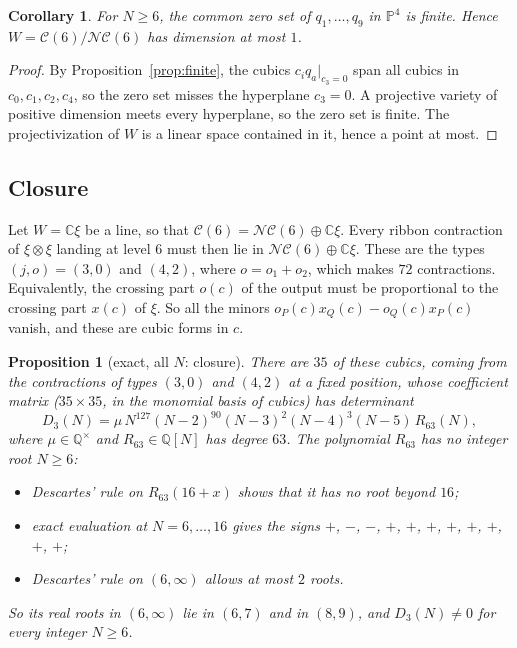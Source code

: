 \documentclass[11pt]{amsart}
\newtheorem{proposition}[theorem]{Proposition}
\newtheorem{corollary}[theorem]{Corollary}
\theoremstyle{definition}
\theoremstyle{remark}
\theoremstyle{plain}
\numberwithin{equation}{section}
\numberwithin{table}{section}
\newcommand{\C}{\mathbb C}
\newcommand{\Q}{\mathbb Q}
\newcommand{\NC}{\mathcal{NC}}
\begin{document}
\begin{corollary}\label{cor:line}
For $N\ge6$, the common zero set of $q_1,\dots,q_9$ in $\mathbb P^4$ is finite. Hence $W=\mathcal C(6)/\NC(6)$ has dimension at most $1$.
\end{corollary}

\begin{proof}
By Proposition~\ref{prop:finite}, the cubics $c_iq_a|_{c_3=0}$ span all cubics in $c_0,c_1,c_2,c_4$, so the zero set misses the hyperplane $c_3=0$. A projective variety of positive dimension meets every hyperplane, so the zero set is finite. The projectivization of $W$ is a linear space contained in it, hence a point at most.
\end{proof}

\subsection{Closure}

Let $W=\C\xi$ be a line, so that $\mathcal C(6)=\NC(6)\oplus\C\xi$. Every ribbon contraction of $\xi\otimes\xi$ landing at level $6$ must then lie in $\NC(6)\oplus\C\xi$. These are the types $(j,o)=(3,0)$ and $(4,2)$, where $o=o_1+o_2$, which makes $72$ contractions. Equivalently, the crossing part $o(c)$ of the output must be proportional to the crossing part $x(c)$ of $\xi$. So all the minors $o_P(c)x_Q(c)-o_Q(c)x_P(c)$ vanish, and these are cubic forms in $c$.

\begin{proposition}[exact, all $N$: closure]\label{prop:closure}
There are $35$ of these cubics, coming from the contractions of types $(3,0)$ and $(4,2)$ at a fixed position, whose coefficient matrix ($35\times35$, in the monomial basis of cubics) has determinant
\[
D_3(N)=\mu\,N^{127}(N-2)^{90}(N-3)^{2}(N-4)^{3}(N-5)\,R_{63}(N),
\]
where $\mu\in\Q^\times$ and $R_{63}\in\Q[N]$ has degree $63$. The polynomial $R_{63}$ has no integer root $N\ge6$:
\begin{itemize}
\item Descartes' rule on $R_{63}(16+x)$ shows that it has no root beyond $16$;
\item exact evaluation at $N=6,\dots,16$ gives the signs $+$, $-$, $-$, $+$, $+$, $+$, $+$, $+$, $+$, $+$, $+$;
\item Descartes' rule on $(6,\infty)$ allows at most $2$ roots.
\end{itemize}
So its real roots in $(6,\infty)$ lie in $(6,7)$ and in $(8,9)$, and $D_3(N)\ne0$ for every integer $N\ge6$.
\end{proposition}
\end{document}
